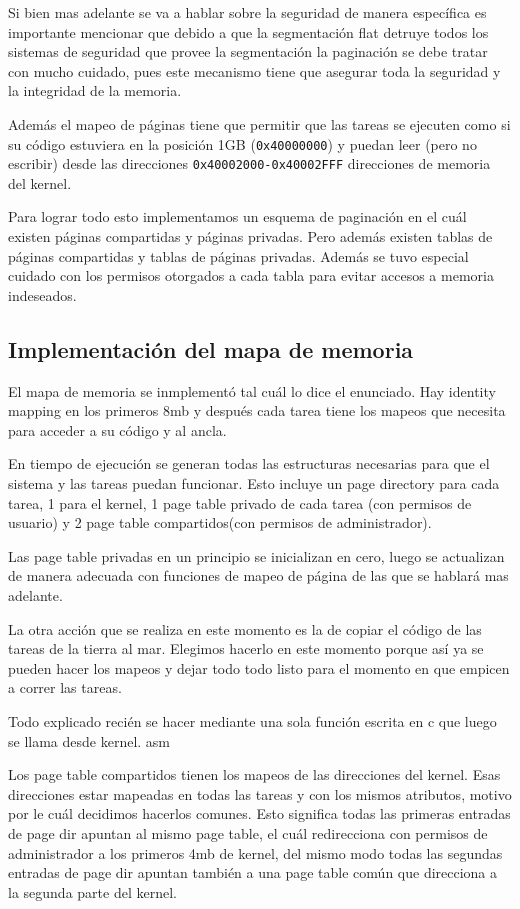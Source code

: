 	Si bien mas adelante se va a hablar sobre la seguridad
de manera específica es importante mencionar que debido a que la
segmentación flat detruye todos los sistemas de seguridad que provee
la segmentación la paginación se debe tratar con mucho cuidado, pues
este mecanismo tiene que asegurar toda la seguridad y la integridad de la memoria.

	Además el mapeo de páginas tiene que permitir que las tareas
se ejecuten como si su código estuviera en la posición 1GB (\texttt{0x40000000})
y puedan leer (pero no escribir) desde las direcciones \texttt{0x40002000-0x40002FFF}
direcciones de memoria del kernel.

	Para lograr todo esto implementamos un esquema de paginación en el cuál
existen páginas compartidas y páginas privadas. Pero además existen tablas
de páginas compartidas y tablas de páginas privadas. Además se tuvo especial
cuidado con los permisos otorgados a cada tabla para evitar accesos a memoria
indeseados.

\subsection{Implementación del mapa de memoria}
	El mapa de memoria se inmplementó tal cuál lo dice el enunciado. Hay
identity mapping en los primeros 8mb y después cada tarea tiene
los mapeos que necesita para acceder a su código y al ancla.
	
	En tiempo de ejecución se generan todas las estructuras necesarias
para que el sistema y las tareas puedan funcionar. Esto incluye un page directory para cada
tarea, 1 para el kernel, 1 page table privado de cada tarea (con
permisos de usuario) y 2 page table compartidos(con permisos de administrador).

	Las page table privadas en un principio se inicializan en cero, luego
se actualizan de manera adecuada con funciones de mapeo de página
de las que se hablará mas adelante.

	La otra acción que se realiza en este momento es la de
copiar el código de las tareas de la tierra al mar. Elegimos hacerlo
en este momento porque así ya se pueden hacer los mapeos y dejar
todo todo listo para el momento en que empicen a correr las tareas.

	Todo explicado recién se hacer mediante una sola función escrita en c
que luego se llama desde kernel. asm

	Los page table compartidos tienen los mapeos de las direcciones del kernel.
Esas direcciones estar mapeadas en todas las tareas y con los mismos atributos, motivo
por le cuál decidimos hacerlos comunes. Esto significa todas las primeras entradas
de page dir apuntan al mismo page table, el cuál redirecciona con permisos de administrador
a los primeros 4mb de kernel, del mismo modo todas las segundas entradas
de page dir apuntan también a una page table común que direcciona
a la segunda parte del kernel.


